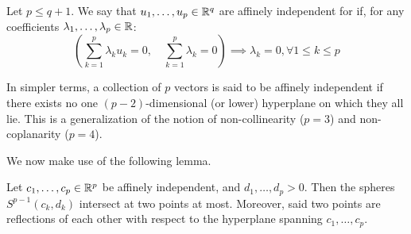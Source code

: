 \begin{Definition}
Let $p\leq q+1$. We say that $u_1, \dots, u_p\in\mathbb R^q$ are affinely independent for if, for any coefficients $\lambda_1, \dots, \lambda_p\in\mathbb R$:
\[
    \left(\sum_{k=1}^p \lambda_k u_k = 0, \quad \sum_{k=1}^p \lambda_k = 0\right) \implies \lambda_k = 0, \forall 1\leq k\leq p
\]
\end{Definition}

In simpler terms, a collection of $p$ vectors is said to be affinely independent if there exists no one $(p-2)$-dimensional (or lower) hyperplane on which they all lie. This is a generalization of the notion of non-collinearity ($p=3$) and non-coplanarity ($p=4$).

We now make use of the following lemma.

\begin{Lemma}
    Let $c_1, \dots, c_p\in\mathbb R^p$ be affinely independent, and $d_1, \dots, d_p>0$. Then the spheres $S^{p-1}(c_k,d_k)$ intersect at two points at most. Moreover, said two points are reflections of each other with respect to the hyperplane spanning $c_1,\dots,c_p$.
\end{Lemma}

